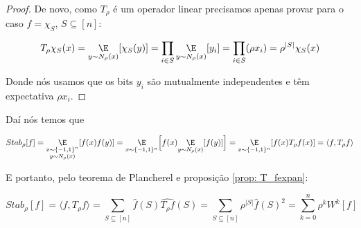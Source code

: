 \begin{proof}

    De novo, como $T_{\rho}$ é um operador linear precisamos apenas provar para o caso $f = \chi_{S}$, $S \subseteq [n]$:

    \begin{equation*}
        T_{\rho}\chi_{S}(x) = \underset{y \sim N_{\rho}(x)}{\E}[\chi_{S}(y)] = \prod_{i \in S}\underset{y \sim N_{\rho}(x)}{\E}[y_{i}] = \prod_{i \in S}(\rho x_{i}) = \rho^{\lvert S \rvert}\chi_{S}(x)
    \end{equation*}  

    Donde nós usamos que os bits $y_{i}$ são mutualmente independentes e têm expectativa $\rho x_{i}$.  

\end{proof}

Daí nós temos que

\begin{equation*}
    Stab_{\rho}[f] = \underset{\substack{x \sim \pmonen \\ y \sim N_{\rho}(x)}}{\E}[f(x)f(y)] = \underset{x \sim \pmonen }{\E}\Big[f(x)\underset{y \sim N_{\rho}(x)}{\E}[f(y)]\Big] = \underset{x \sim \pmonen}{\E}[f(x)T_{\rho}f(x)] = \langle f, T_{\rho}f \rangle
\end{equation*}

E portanto, pelo teorema de Plancherel e proposição \ref{prop: T_fexpan}:

\begin{equation*}
    Stab_{\rho}[f] = \langle f, T_{\rho}f \rangle = \sum_{S \subseteq [n]} \widehat{f}(S) \widehat{T_{\rho}f}(S)
                                                  = \sum_{S \subseteq [n]} \rho^{\lvert S \rvert} \widehat{f}(S)^{2}
                                                  = \sum_{k = 0}^{n} \rho^{k} W^{k}[f]
\end{equation*}






